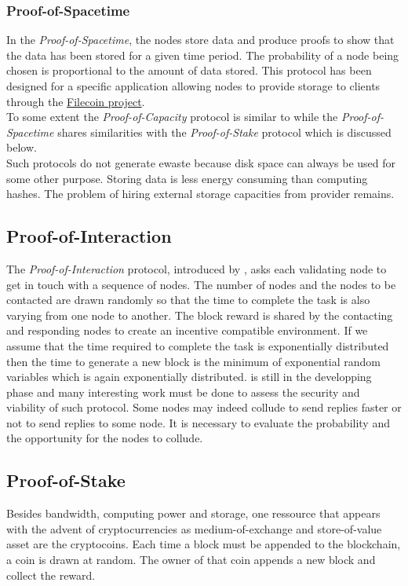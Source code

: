 \subsubsection{Proof-of-Spacetime}
In the \textit{Proof-of-Spacetime}, the nodes store data and produce proofs to show that the data has been stored for a given time period. The probability of a node being chosen is proportional to the amount of data stored. This protocol has been designed for a specific application allowing nodes to provide storage to clients through the \href{https://filecoin.io/}{Filecoin project}.\\

\noindent To some extent the \textit{Proof-of-Capacity} protocol is similar to \PoW while the \textit{Proof-of-Spacetime} shares similarities with the \textit{Proof-of-Stake} protocol which is discussed below.\\

\noindent Such protocols do not generate ewaste because disk space can always be used for some other purpose. Storing data is less energy consuming than computing hashes. The problem of hiring external storage capacities from provider remains.
\subsection{Proof-of-Interaction}\label{ssec:poi}
The \textit{Proof-of-Interaction} protocol, introduced by \citet{Abegg2021}, asks each validating node to get in touch with a sequence of nodes. The number of nodes and the nodes to be contacted are drawn randomly so that the time to complete the task is also varying from one node to another. The block reward is shared by the contacting and responding nodes to create an incentive compatible environment. If we assume that the time required to complete the task is exponentially distributed then the time to generate a new block is the minimum of exponential random variables which is again exponentially distributed. 
\PoI is still in the developping phase and many interesting work must be done to assess the security and viability of such protocol. Some nodes may indeed collude to send replies faster or not to send replies to some node. It is necessary to evaluate the probability and the opportunity for the nodes to collude.
\subsection{Proof-of-Stake}\label{ssec:pos}
Besides bandwidth, computing power and storage, one ressource that appears with the advent of cryptocurrencies as medium-of-exchange and store-of-value asset are the cryptocoins. Each time a block must be appended to the blockchain, a coin is drawn at random. The owner of that coin appends a new block and collect the reward. \\

